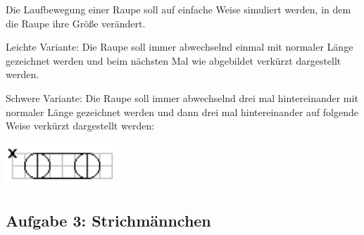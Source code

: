 \begin{compactenum}[a)]
\item Die Laufbewegung einer Raupe soll auf einfache Weise simuliert werden, in
dem die Raupe ihre Größe verändert.

\begin{compactitem}
\item Leichte Variante: Die Raupe soll immer abwechselnd einmal mit normaler
Länge gezeichnet werden und beim nächsten Mal wie abgebildet verkürzt
dargestellt werden.
\item Schwere Variante: Die Raupe soll immer abwechselnd drei mal hintereinander
mit normaler Länge gezeichnet werden und dann drei mal hintereinander auf
folgende Weise verkürzt dargestellt werden:

\begin{center}
\includegraphics[width=0.32\textwidth]{./inf/SEKII/10_Java_Klassen/raupe_kurz.png}
\end{center}

\end{compactitem}

\end{compactenum}


\subsection{Aufgabe 3: Strichmännchen}

